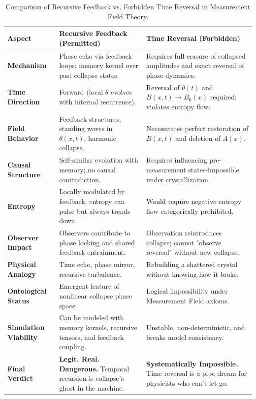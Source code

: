 \begin{table}[H]
  \centering
  \renewcommand{\arraystretch}{1.4}
  \begin{tabular}{|p{4.2cm}|p{5.5cm}|p{5.5cm}|}
  \hline
  \textbf{Aspect} & \textbf{Recursive Feedback (Permitted)} & \textbf{Time Reversal (Forbidden)} \\
  \hline
  \textbf{Mechanism} & Phase echo via feedback loops; memory kernel over past collapse states. & Requires full erasure of collapsed amplitudes and exact reversal of phase dynamics. \cite{chapter_time} \\
  \hline
  \textbf{Time Direction} & Forward (local $\theta$ evolves with internal recurrence). & Reversal of $\theta(t)$ and $B(x,t) \to B_0(x)$ required; violates entropy flow. \cite{chapter_time} \\
  \hline
  \textbf{Field Behavior} & Feedback structures, standing waves in $\theta(x,t)$, harmonic collapse. & Necessitates perfect restoration of $B(x,t)$ and deletion of $A(x)$. \cite{chapter_time} \\
  \hline
  \textbf{Causal Structure} & Self-similar evolution with memory; no causal contradiction. & Requires influencing pre-measurement states-impossible under crystallization. \cite{chapter_time} \\
  \hline
  \textbf{Entropy} & Locally modulated by feedback; entropy can pulse but always trends down. & Would require negative entropy flow-categorically prohibited. \cite{chapter_time} \\
  \hline
  \textbf{Observer Impact} & Observers contribute to phase locking and shared feedback entrainment. & Observation reintroduces collapse; cannot "observe reversal" without new collapse. \cite{chapter_time} \\
  \hline
  \textbf{Physical Analogy} & Time echo, phase mirror, recursive turbulence. & Rebuilding a shattered crystal without knowing how it broke. \cite{chapter_time} \\
  \hline
  \textbf{Ontological Status} & Emergent feature of nonlinear collapse phase space. & Logical impossibility under Measurement Field axioms. \cite{chapter_time} \\
  \hline
  \textbf{Simulation Viability} & Can be modeled with memory kernels, recursive tensors, and feedback coupling. & Unstable, non-deterministic, and breaks model consistency. \cite{chapter_time} \\
  \hline
  \textbf{Final Verdict} & \textbf{Legit. Real. Dangerous.} Temporal recursion is collapse’s ghost in the machine. & \textbf{Systematically Impossible.} Time reversal is a pipe dream for physicists who can't let go. \cite{chapter_time} \\
  \hline
  \end{tabular}
  \caption{Comparison of Recursive Feedback vs. \cite{chapter_time} Forbidden Time Reversal in Measurement Field Theory.}
  \label{tab:recursive_vs_reversal}
  \end{table}
  


